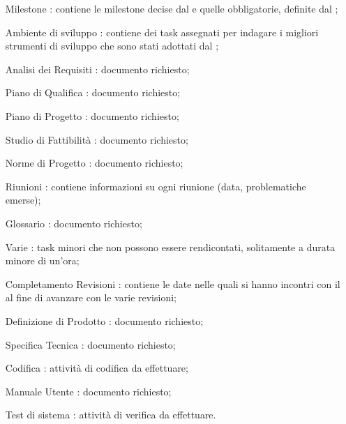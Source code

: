 \begin{itemize}
\item [Milestone]: contiene le milestone decise dal  e quelle obbligatorie, definite dal \TV;
\item [Ambiente di sviluppo]: contiene dei task assegnati per indagare i migliori strumenti di sviluppo che sono stati adottati dal ;
\item [Analisi dei Requisiti]: documento richiesto;
\item [Piano di Qualifica]: documento richiesto;
\item [Piano di Progetto]: documento richiesto;
\item [Studio di Fattibilità]: documento richiesto;
\item [Norme di Progetto]: documento richiesto;
\item [Riunioni]: contiene informazioni su ogni riunione (data, problematiche emerse);
\item [Glossario]: documento richiesto;
\item [Varie]: task minori che non possono essere rendicontati, solitamente a durata minore di un'ora;
\item [Completamento Revisioni]: contiene le date nelle quali si hanno incontri con il \TV al fine di avanzare con le varie revisioni; 
\item [Definizione di Prodotto]: documento richiesto;
\item [Specifica Tecnica]: documento richiesto;
\item [Codifica]: attività di codifica da effettuare;
\item [Manuale Utente]: documento richiesto;
\item [Test di sistema]: attività di verifica da effettuare.
\end{itemize}

